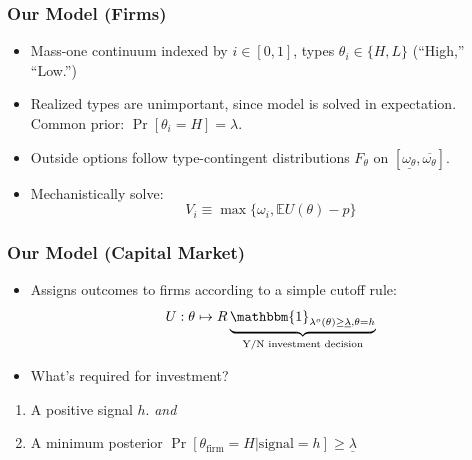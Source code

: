 \documentclass{beamer}
\begin{document}
\begin{frame}
    \frametitle{Our Model (Firms)}
    \begin{itemize}[<+>]
        \item Mass-one continuum indexed by $i \in [0, 1]$, types $\theta_i \in \{H, L\}$ (``High,'' ``Low.'')
        \item Realized types are unimportant, since model is solved in expectation. Common prior: $\Pr[\theta_i = H] = \lambda$. 
        \item Outside options follow type-contingent distributions $F_\theta$ on $[\underline{\omega_\theta}, \overline{\omega_\theta}]$. 
        \item Mechanistically solve: 
        \begin{equation}
            V_i \equiv \max \{\omega_i, \mathbb{E} U(\theta) - p \}
            \label{firm-objective}
        \end{equation}
    \end{itemize}
\end{frame}

\begin{frame}
    \frametitle{Our Model (Capital Market)}
    \begin{itemize}[<+>]
        \item Assigns outcomes to firms according to a simple cutoff rule: 
        \begin{equation}
            U: \theta \mapsto R \underbrace{\mathbbm{1}_{\lambda^o(\theta) \geq \underline{\lambda}, \theta = h}}_{\text{Y/N investment decision}}    
            \label{market-objective}
        \end{equation}
        \item What's required for investment? 
    \end{itemize}
    \begin{enumerate}
        \item A positive signal $h$. \emph{and}
        \item A minimum posterior $\Pr[\theta_\text{firm} = H | \text{signal} = h] \geq \underline{\lambda}$ 
    \end{enumerate}
\end{frame}
\end{document}
